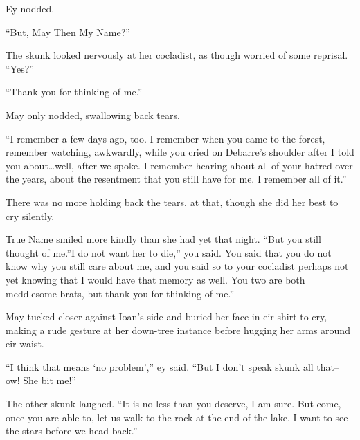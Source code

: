 Ey nodded.

``But, May Then My Name?''

The skunk looked nervously at her cocladist, as though worried of some reprisal. ``Yes?''

``Thank you for thinking of me.''

May only nodded, swallowing back tears.

``I remember a few days ago, too. I remember when you came to the forest, remember watching, awkwardly, while you cried on Debarre's shoulder after I told you about\ldots well, after we spoke. I remember hearing about all of your hatred over the years, about the resentment that you still have for me. I remember all of it.''

There was no more holding back the tears, at that, though she did her best to cry silently.

True Name smiled more kindly than she had yet that night. ``But you still thought of me.''I do not want her to die,'' you said. You said that you do not know why you still care about me, and you said so to your cocladist perhaps not yet knowing that I would have that memory as well. You two are both meddlesome brats, but thank you for thinking of me.''

May tucked closer against Ioan's side and buried her face in eir shirt to cry, making a rude gesture at her down-tree instance before hugging her arms around eir waist.

``I think that means `no problem','' ey said. ``But I don't speak skunk all that-- ow! She bit me!''

The other skunk laughed. ``It is no less than you deserve, I am sure. But come, once you are able to, let us walk to the rock at the end of the lake. I want to see the stars before we head back.''
